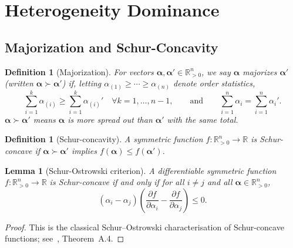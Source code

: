 \documentclass[twocolumn,11pt,a4paper]{article}
\newtheorem{lemma}[theorem]{Lemma}
\newtheorem{definition}[theorem]{Definition}
\theoremstyle{remark}
\newcommand{\R}{\mathbb{R}}
\begin{document}
\section{Heterogeneity Dominance}
\label{sec:dominance}

\subsection{Majorization and Schur-Concavity}
\label{sec:dominance:schur}

\begin{definition}[Majorization]
\label{def:majorization}
For vectors $\boldsymbol\alpha, \boldsymbol\alpha' \in \R_{>0}^n$, we say
$\boldsymbol\alpha$ \emph{majorizes} $\boldsymbol\alpha'$ (written
$\boldsymbol\alpha \succ \boldsymbol\alpha'$) if, letting $\alpha_{(1)} \ge
\cdots \ge \alpha_{(n)}$ denote order statistics,
\[
  \sum_{i=1}^k \alpha_{(i)} \ge \sum_{i=1}^k \alpha_{(i)}'
  \quad \forall k = 1,\ldots,n-1,
  \qquad \text{and} \qquad
  \sum_{i=1}^n \alpha_i = \sum_{i=1}^n \alpha_i'.
\]
$\boldsymbol\alpha \succ \boldsymbol\alpha'$ means $\boldsymbol\alpha$ is
\emph{more spread out} than $\boldsymbol\alpha'$ with the same total.
\end{definition}

\begin{definition}[Schur-concavity]
\label{def:schur-concave}
A symmetric function $f: \R_{>0}^n \to \R$ is \emph{Schur-concave} if
$\boldsymbol\alpha \succ \boldsymbol\alpha'$ implies
$f(\boldsymbol\alpha) \le f(\boldsymbol\alpha')$.
\end{definition}

\begin{lemma}[Schur-Ostrowski criterion]
\label{lem:schur-ostrowski}
A differentiable symmetric function $f: \R_{>0}^n \to \R$ is Schur-concave
if and only if for all $i \neq j$ and all
$\boldsymbol\alpha \in \R_{>0}^n$,
\[
  (\alpha_i - \alpha_j)\!\left(\frac{\partial f}{\partial \alpha_i}
  - \frac{\partial f}{\partial \alpha_j}\right) \le 0.
\]
\end{lemma}
\begin{proof}
This is the classical Schur--Ostrowski characterisation of Schur-concave
functions; see~\cite{marshall2011}, Theorem~A.4.
\end{proof}
\end{document}
